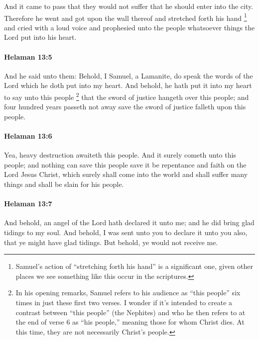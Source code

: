 			And it came to pass that they would not suffer
			that he should enter into the city.
			Therefore he went and got upon the wall thereof
			and stretched forth his hand%
			\footnote{%
				Samuel's action of ``stretching forth his hand'' is a significant one, given other places we see something like this occur in the scriptures. 
				}
			and cried with a loud voice
			and prophesied unto the people whatsoever things the Lord put into his heart.

		\paragraph{Helaman 13:5} %
			\label{HELAMAN-13-5}

			And he said unto them:
			Behold, I Samuel, a Lamanite, do speak the words of the Lord
			which he doth put into my heart.
			And behold, he hath put it into my heart to say unto this people%
				\footnote{%
					In his opening remarks, Samuel refers to his audience as ``this people'' six times in just these first two verses. I wonder if it's intended to create a contrast between ``this people'' (the Nephites) and who he then refers to at the end of verse 6 as ``his people,'' meaning those for whom Christ dies. At this time, they are not necessarily Christ's people.
					}
			that the sword of justice hangeth over this people;
			and four hundred years passeth not away
			save the sword of justice falleth upon this people.

		\paragraph{Helaman 13:6} %
			\label{HELAMAN-13-6}

			Yea, heavy destruction awaiteth this people.
			And it surely cometh unto this people;
			and nothing can save this people
			save it be repentance and faith on the Lord Jesus Christ,
			which surely shall come into the world
			and shall suffer many things
			and shall be slain for his people.

		\paragraph{Helaman 13:7} %
			\label{HELAMAN-13-7}

			And behold, an angel of the Lord hath declared it unto me;
			and he did bring glad tidings to my soul.
			And behold, I was sent unto you to declare it unto you also,
			that ye might have glad tidings.
			But behold, ye would not receive me.

